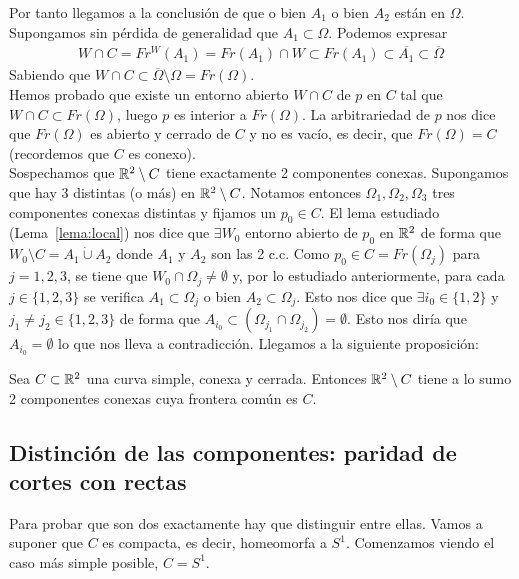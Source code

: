 \begin{observacion}
    Por tanto llegamos a la conclusión de que o bien $A_1$ o bien $A_2$ están en $\Omega$. Supongamos sin pérdida de generalidad que $A_1 \subset \Omega$. Podemos expresar
    \begin{gather*}
        W \cap C = Fr^W(A_1) = Fr(A_1) \cap W \subset Fr(A_1) \subset \overline{A_1} \subset \overline{\Omega}
    \end{gather*}
    Sabiendo que $W\cap C \subset \overline{\Omega} \setminus \Omega = Fr(\Omega)$. \\
    
    Hemos probado que existe un entorno abierto $W\cap C$ de $p$ en $C$ tal que $W\cap C \subset Fr(\Omega)$, luego $p$ es interior a $Fr(\Omega)$. La arbitrariedad de $p$ nos dice que $Fr(\Omega)$ es abierto y cerrado de $C$ y no es vacío, es decir, que $Fr(\Omega)=C$ (recordemos que $C$ es conexo).\\

    Sospechamos que $\mathbb{R}^2 \setminus C$ tiene exactamente 2 componentes conexas. Supongamos que hay 3 distintas (o más) en $\mathbb{R}^2 \setminus C$. Notamos entonces $\Omega_1, \Omega_2, \Omega_3$ tres componentes conexas distintas y fijamos un $p_0\in C$. El lema estudiado (Lema~\ref{lema:local}) nos dice que $\exists W_0$ entorno abierto de $p_0$ en $\mathbb{R}^2$ de forma que $W_0\setminus C = A_1 \dot{\cup} A_2$ donde $A_1$ y $A_2$ son las 2 c.c. Como $p_0\in C=Fr(\Omega_j)$ para $j=1,2,3$, se tiene que $W_0\cap \Omega_j\neq\emptyset$ y, por lo estudiado anteriormente, para cada $j\in\{1,2,3\}$ se verifica $A_1 \subset \Omega_j$ o bien $A_2\subset \Omega_j$. Esto nos dice que $\exists i_0 \in \{1,2\}$ y $j_1\neq j_2 \in \{1,2,3\}$ de forma que $A_{i_0} \subset (\Omega_{j_1}\cap \Omega_{j_2})=\emptyset$. Esto nos diría que $A_{i_0}=\emptyset$ lo que nos lleva a contradicción. Llegamos a la siguiente proposición:
\end{observacion}

\begin{prop}\label{prop:max2}
    Sea $C\subset \mathbb{R}^2$ una curva simple, conexa y cerrada. Entonces $\mathbb{R}^2 \setminus C$ tiene a lo sumo 2 componentes conexas cuya frontera común es $C$.
\end{prop}

\subsection{Distinción de las componentes: paridad de cortes con rectas}

Para probar que son dos exactamente hay que distinguir entre ellas. Vamos a suponer que $C$ es compacta, es decir, homeomorfa a $S^1$. Comenzamos viendo el caso más simple posible, $C=S^1$.\\

